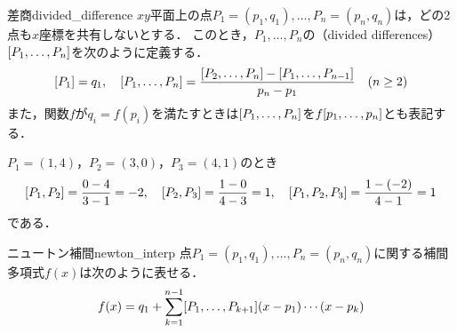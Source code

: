 \documentclass[../../numcalc]{subfiles}
\begin{document}
\begin{definition}{差商}{divided_difference}
\(xy\)平面上の点\(P_1=(p_1,q_1),\dots,P_n=(p_n,q_n)\)は，どの2点も\(x\)座標を共有しないとする．
このとき，\(P_1,\dots,P_n\)の（divided differences）\(\divdiff{P_1,\dots,P_n}\)を次のように定義する\footnotemark ．
\[
  \divdiff{P_1} = q_1,
  \quad\divdiff{P_1,\dots,P_n} = \frac{\divdiff{P_2,\dots,P_n}-\divdiff{P_1,\dots,P_{n-1}}}{p_n-p_1}\quad(n\geq 2)
\]
また，関数\(f\)が\(q_i=f(p_i)\)を満たすときは\(\divdiff{P_1,\dots,P_n}\)を\(\divdiff[f]{p_1,\dots,p_n}\)とも表記する．
\end{definition}

\begin{example}
\label{example:divdiff}
\(P_1=(1,4)\)，\(P_2=(3,0)\)，\(P_3=(4,1)\)のとき
\[
  \divdiff{P_1,P_2} = \frac{0-4}{3-1} = -2,
  \quad\divdiff{P_2,P_3} = \frac{1-0}{4-3} = 1,
  \quad\divdiff{P_1,P_2,P_3} = \frac{1-(-2)}{4-1} = 1
\]
である．
\end{example}

\begin{theorem}{ニュートン補間}{newton_interp}
点\(P_1=(p_1,q_1),\dots,P_n=(p_n,q_n)\)に関する補間多項式\(f(x)\)は次のように表せる．
\begin{equation}
  \label{equation:newton_interp}
  f(x) = q_1+\sum_{k=1}^{n-1}\divdiff{P_1,\dots,P_{k+1}}(x-p_1)\dotsm(x-p_k)
\end{equation}
\end{theorem}
\end{document}
